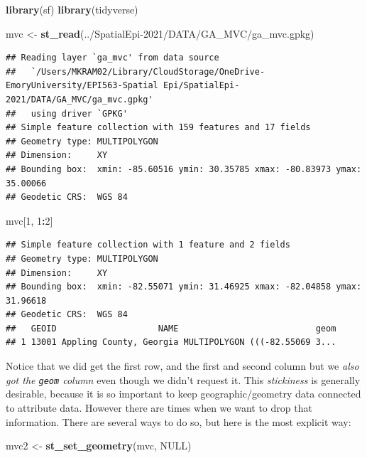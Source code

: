\documentclass[
]{book}
\newenvironment{Shaded}{\begin{snugshade}}{\end{snugshade}}
\newcommand{\ConstantTok}[1]{\textcolor[rgb]{0.56,0.35,0.01}{#1}}
\newcommand{\DecValTok}[1]{\textcolor[rgb]{0.00,0.00,0.81}{#1}}
\newcommand{\FunctionTok}[1]{\textcolor[rgb]{0.13,0.29,0.53}{\textbf{#1}}}
\newcommand{\NormalTok}[1]{#1}
\newcommand{\OtherTok}[1]{\textcolor[rgb]{0.56,0.35,0.01}{#1}}
\newcommand{\SpecialCharTok}[1]{\textcolor[rgb]{0.81,0.36,0.00}{\textbf{#1}}}
\newcommand{\StringTok}[1]{\textcolor[rgb]{0.31,0.60,0.02}{#1}}
\begin{document}
\begin{Shaded}
\begin{Highlighting}[]
\FunctionTok{library}\NormalTok{(sf)}
\FunctionTok{library}\NormalTok{(tidyverse)}

\NormalTok{mvc }\OtherTok{\textless{}{-}} \FunctionTok{st\_read}\NormalTok{(}\StringTok{\textquotesingle{}../SpatialEpi{-}2021/DATA/GA\_MVC/ga\_mvc.gpkg\textquotesingle{}}\NormalTok{)}
\end{Highlighting}
\end{Shaded}

\begin{verbatim}
## Reading layer `ga_mvc' from data source 
##   `/Users/MKRAM02/Library/CloudStorage/OneDrive-EmoryUniversity/EPI563-Spatial Epi/SpatialEpi-2021/DATA/GA_MVC/ga_mvc.gpkg' 
##   using driver `GPKG'
## Simple feature collection with 159 features and 17 fields
## Geometry type: MULTIPOLYGON
## Dimension:     XY
## Bounding box:  xmin: -85.60516 ymin: 30.35785 xmax: -80.83973 ymax: 35.00066
## Geodetic CRS:  WGS 84
\end{verbatim}

\begin{Shaded}
\begin{Highlighting}[]
\NormalTok{mvc[}\DecValTok{1}\NormalTok{, }\DecValTok{1}\SpecialCharTok{:}\DecValTok{2}\NormalTok{]}
\end{Highlighting}
\end{Shaded}

\begin{verbatim}
## Simple feature collection with 1 feature and 2 fields
## Geometry type: MULTIPOLYGON
## Dimension:     XY
## Bounding box:  xmin: -82.55071 ymin: 31.46925 xmax: -82.04858 ymax: 31.96618
## Geodetic CRS:  WGS 84
##   GEOID                    NAME                           geom
## 1 13001 Appling County, Georgia MULTIPOLYGON (((-82.55069 3...
\end{verbatim}

Notice that we did get the first row, and the first and second column but we \emph{also got the \texttt{geom} column} even though we didn't request it. This \emph{stickiness} is generally desirable, because it is so important to keep geographic/geometry data connected to attribute data. However there are times when we want to drop that information. There are several ways to do so, but here is the most explicit way:

\begin{Shaded}
\begin{Highlighting}[]
\NormalTok{mvc2 }\OtherTok{\textless{}{-}} \FunctionTok{st\_set\_geometry}\NormalTok{(mvc, }\ConstantTok{NULL}\NormalTok{)}
\end{Highlighting}
\end{Shaded}
\end{document}
